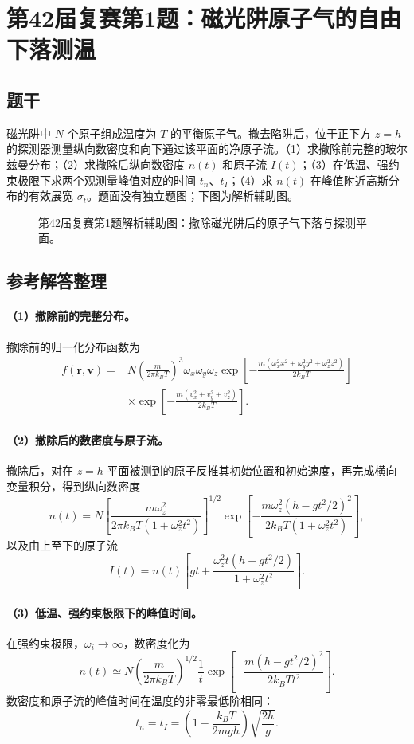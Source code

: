 \section{第42届复赛第1题：磁光阱原子气的自由下落测温}
\subsection{题干}
磁光阱中 $N$ 个原子组成温度为 $T$ 的平衡原子气。撤去陷阱后，位于正下方 $z=h$ 的探测器测量纵向数密度和向下通过该平面的净原子流。（1）求撤除前完整的玻尔兹曼分布；（2）求撤除后纵向数密度 $n(t)$ 和原子流 $I(t)$；（3）在低温、强约束极限下求两个观测量峰值对应的时间 $t_n$、$t_I$；（4）求 $n(t)$ 在峰值附近高斯分布的有效展宽 $\sigma_t$。题面没有独立题图；下图为解析辅助图。
\begin{figure}[htbp]\centering\caption{第42届复赛第1题解析辅助图：撤除磁光阱后的原子气下落与探测平面。}\end{figure}
\subsection{参考解答整理}
\paragraph{（1）撤除前的完整分布。}
撤除前的归一化分布函数为
\[\begin{aligned}
f(\boldsymbol r,\boldsymbol v)={}&N\left(\frac{m}{2\pi k_BT}\right)^3\omega_x\omega_y\omega_z
\exp\left[-\frac{m(\omega_x^2x^2+\omega_y^2y^2+\omega_z^2z^2)}{2k_BT}\right]\\
&\times\exp\left[-\frac{m(v_x^2+v_y^2+v_z^2)}{2k_BT}\right].
\end{aligned}\]
\paragraph{（2）撤除后的数密度与原子流。}
撤除后，对在 $z=h$ 平面被测到的原子反推其初始位置和初始速度，再完成横向变量积分，得到纵向数密度
\[n(t)=N\left[\frac{m\omega_z^2}{2\pi k_BT(1+\omega_z^2t^2)}\right]^{1/2}
\exp\left[-\frac{m\omega_z^2(h-gt^2/2)^2}{2k_BT(1+\omega_z^2t^2)}\right],\]
以及由上至下的原子流
\[I(t)=n(t)\left[gt+\frac{\omega_z^2t(h-gt^2/2)}{1+\omega_z^2t^2}\right].\]
\paragraph{（3）低温、强约束极限下的峰值时间。}
在强约束极限，$\omega_i\to\infty$，数密度化为
\[n(t)\simeq N\left(\frac{m}{2\pi k_BT}\right)^{1/2}\frac1t
\exp\left[-\frac{m(h-gt^2/2)^2}{2k_BTt^2}\right].\]
数密度和原子流的峰值时间在温度的非零最低阶相同：
\[t_n=t_I=\left(1-\frac{k_BT}{2mgh}\right)\sqrt{\frac{2h}{g}}.\]

